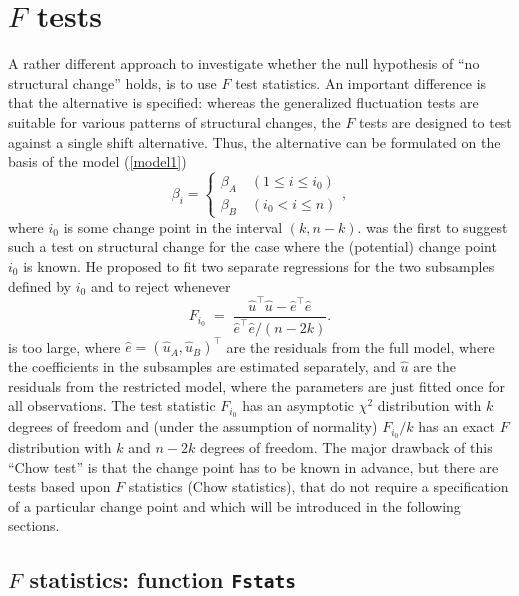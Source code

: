 \documentclass[10pt,a4paper]{article}
\begin{document}
\section{$F$ tests} \label{sec:Ftests}

A rather different approach to investigate whether the null hypothesis
of ``no structural change'' holds, is to use $F$ test statistics. An important
difference is that the alternative is specified: whereas the generalized
fluctuation tests are suitable for various patterns of structural changes, the
$F$ tests are designed to test against a single shift alternative. Thus, the
alternative can be formulated on the basis of the model (\ref{model1})
\begin{equation} \label{H1}
\beta_i = \left\{ \begin{array}{l} \beta_A \quad (1 \le i \le i_0) \\
\beta_B \quad (i_0 < i \le n) \end{array} \right.,
\end{equation}
where $i_0$ is some change point in the interval $(k, n-k)$. \cite{Z:Chow:1960}
was the first to suggest such a test on structural change for the case where the
(potential) change point $i_0$ is known.
He proposed to fit two separate regressions for the two subsamples defined by
$i_0$ and to reject whenever
\begin{equation} \label{Fstat}
F_{i_0} \; = \; \frac{{\hat u}^\top {\hat u} - {\hat e}^\top {\hat
e}}{{\hat e}^\top {\hat e}/(n-2k)}.
\end{equation}
is too large, where $\hat e = (\hat u_A, \hat u_B)^\top$ are the residuals from
the full model, where the coefficients in the subsamples are estimated
separately, and $\hat u$ are the residuals from the restricted model, where the
parameters are just fitted once for all observations. The test statistic
$F_{i_0}$ has an asymptotic $\chi^2$ distribution with $k$ degrees of freedom 
and (under the assumption of normality) $F_{i_0}/k$ has an exact $F$
distribution with $k$ and $n-2k$ degrees of freedom. The major drawback of this
``Chow test'' is that the change point has to be known in advance, but there are
tests based upon $F$ statistics (Chow statistics), that do not require a
specification of a particular change point and which will be introduced in the
following sections.

\subsection{$F$ statistics: function \texttt{Fstats}}
\end{document}
